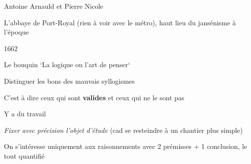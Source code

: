
\begin{frame}
	
	\begin{description}[labelindent=6pt,style=multiline,leftmargin=1.3in]
		 \setlength\itemsep{1.4em}
		 
		 \item[Qui] Antoine Arnauld et Pierre Nicole
		 \pause
		 \item[Où] L'abbaye de Port-Royal (rien à voir avec le métro), haut lieu du jansénisme à l'époque
		 \pause
		 \item[Quand] 1662
		 \pause
		 \item[Quoi] Le bouquin `La logique ou l'art de penser`
		 
	\end{description}
\end{frame}



\begin{frame}
	
	\begin{description}[labelindent=6pt,style=multiline,leftmargin=1.3in]
		 \setlength\itemsep{1.4em}
		 
		 \item[But] Distinguer les bons des mauvais syllogismes
		 \pause
		 \item[] C'est à dire ceux qui sont \textbf{valides} et ceux qui ne le sont pas
		 \pause
		 \item[Problème] Y a du travail
		 \pause
		 \item[`Solution`] \textit{Fixer avec précision l'objet d'étude} \pause (cad se resteindre à un chantier plus simple) \pause
		 \item On s'intéresse uniquement aux raisonnements avec 2 prémisses + 1 conclusion\pause, le tout quantifié
 		 
	\end{description}
\end{frame}



